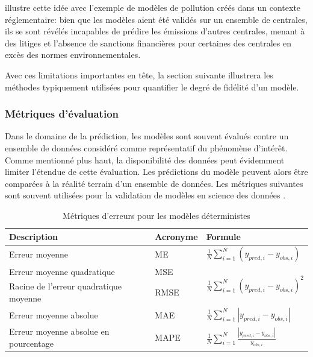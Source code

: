             \textcite{oreskes_evaluation_1998} illustre cette idée avec l'exemple de modèles de pollution créés dans un contexte réglementaire: bien que les modèles aient été validés sur un ensemble de centrales, ils se sont révélés incapables de prédire les émissions d'autres centrales, menant à des litiges et l'absence de sanctions financières pour certaines des centrales en excès des normes environnementales.\par
            Avec ces limitations importantes en tête, la section suivante illustrera les méthodes typiquement utilisées pour quantifier le degré de fidélité d'un modèle.
            
            
        
        \subsubsection{Métriques d'évaluation}
            Dans le domaine de la prédiction, les modèles sont souvent évalués contre un ensemble de données considéré comme représentatif du phénomène d'intérêt. Comme mentionné plus haut, la disponibilité des données peut évidemment limiter l'étendue de cette évaluation. Les prédictions du modèle peuvent alors être comparées à la réalité terrain d'un ensemble de données. Les métriques suivantes sont souvent utilisées pour la validation de modèles en science des données \parencite{agard_ind6212_2024}.\par
            \begin{table}[H]
                \caption{Métriques d'erreurs pour les modèles déterministes}
                \label{tab:deterministic-model-error-metrics}
                \centering
                \begin{tabular}{p{}p{}p{}}
                \hline
                     Description& Acronyme & Formule   \\ \hline
                     Erreur moyenne & ME & $\frac{1}{N}\sum_{i=1}^N (y_{pred,i} - y_{obs,i})$  \\
                     Erreur moyenne quadratique & MSE & \multirow{2}{*}{$\frac{1}{N}\sum_{i=1}^N (y_{pred,i} - y_{obs,i})^2$}  \\
                     Racine de l'erreur quadratique moyenne & RMSE & \multirow{2}{*}{$\sqrt{\frac{1}{N}\sum_{i=1}^N (y_{pred,i} - y_{obs,i})^2}$}\\
                     Erreur moyenne absolue & MAE & $\frac{1}{N} \sum_{i=1}^N \left|y_{pred,i} - y_{obs,i}\right|$ \\
                     Erreur moyenne absolue en pourcentage & MAPE & \multirow{2}{*}{$\frac{1}{N} \sum_{i=1}^N \frac{\left|y_{pred,i} - y_{obs,i}\right|}{y_{obs,i}}$}\\
                     \hline
                \end{tabular}
            \end{table}
